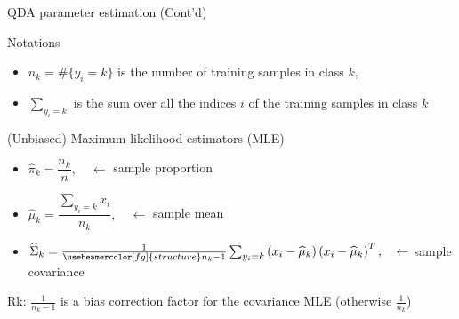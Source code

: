 \documentclass[compress, smaller, serif, 9pt]{beamer}
\newcommand{\structuretext}[1]{{\usebeamercolor[fg]{structure} #1}}
\begin{document}
\begin{frame}{QDA parameter estimation (Cont'd)}

\begin{block}{Notations}
   \begin{itemize}
      \item $n_k= \#\{ y_i=k \}$ is the number of training samples in class $k$,
      \item $\sum_{y_i=k}$ is the sum over all the indices $i$ of the training samples in class $k$
   \end{itemize}
\end{block}


\begin{block}{(Unbiased) Maximum likelihood estimators (MLE)}
\begin{itemize}
 \item $\widehat{\pi}_k = \dfrac{n_k}{n},  \quad \leftarrow $ sample proportion
 \item $\widehat{\mu}_k = \dfrac{\sum_{y_i=k} x_i}{n_k}, \quad \leftarrow $ sample mean
 \item $\widehat{\Sigma}_k = \frac{1}{\structuretext{n_k-1}} \sum_{y_i=k} \left(x_i-\widehat{\mu}_k \right) \left(x_i-\widehat{\mu}_k \right)^T,
 \quad \leftarrow $ sample covariance
\end{itemize}
Rk:  $\frac{1}{n_k-1}$ is a bias correction factor for the covariance MLE (otherwise $\frac{1}{n_k}$)
\end{block}


\end{frame}
\end{document}
